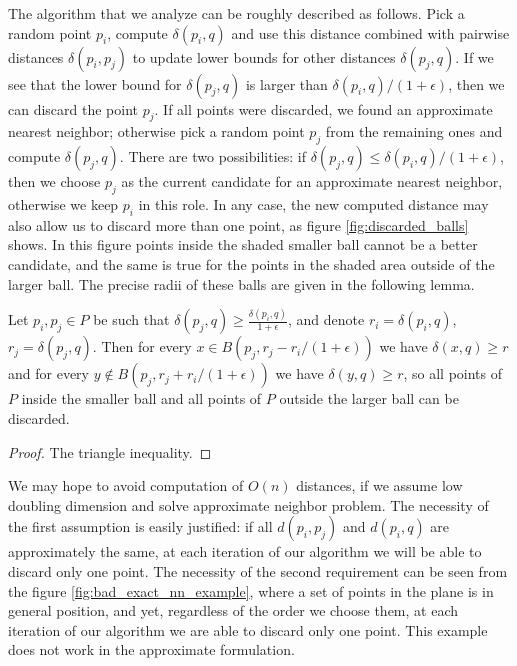 \documentclass[a4paper,USenglish]{socg-lipics-v2018}
\newcommand{\eps}{\epsilon}
\newcommand{\dist}{\delta}
\begin{document}
The algorithm that we analyze can be roughly described as follows. 
Pick a random point $p_i$,
compute $\dist(p_i, q)$ and use this distance combined with pairwise distances $\dist(p_i, p_j)$
to update lower bounds for other distances $\dist(p_j, q)$.
If we see that the lower bound for $\dist(p_j, q)$ is larger than $\dist(p_i, q) / (1+\eps)$, then 
we can discard the point $p_j$. If all points were discarded, we found an approximate nearest neighbor;
otherwise pick a random point $p_j$ from the remaining ones and compute $\dist(p_j, q)$.
There are two possibilities: if $\dist(p_j, q) \leq \dist(p_i, q) / (1+\eps)$,
then we choose $p_j$ as the current candidate for an approximate nearest neighbor,
otherwise we keep $p_i$ in this role. In any case, the new computed distance
may also allow us to discard more than one point, as figure \ref{fig:discarded_balls} shows. In
this figure points inside the shaded smaller ball cannot be a better candidate,
and the same is true for the points in the shaded area outside of the larger ball.
The precise radii of these balls are given in the following lemma.



\begin{lemma}
    Let $p_i, p_j \in P$ be such that $\dist(p_j, q) \geq \frac{\dist(p_i, q)}{1 + \eps}$,
    and denote $r_i = \dist(p_i, q)$, $r_j = \dist(p_j, q)$.
    Then for every $x \in B(p_j, r_j - r_i / (1+\eps))$ we have $\dist(x, q) \geq r$
    and for every $y \notin B(p_j, r_j + r_i / (1+ \eps))$ we have $\dist(y, q) \geq r$,
    so all points of $P$ inside the smaller ball and all points of $P$ outside the larger ball
    can be discarded.
\end{lemma}
\begin{proof}
    The triangle inequality.
\end{proof}


We may hope to avoid computation of $O(n)$ distances, if we assume low doubling dimension
and solve approximate neighbor problem. The necessity of the first assumption is easily justified: if all $d(p_i, p_j)$
and $d(p_i, q)$ are approximately the same, at each iteration of our algorithm we will be able to discard only one point.
The necessity of the second requirement can be seen from the figure \ref{fig:bad_exact_nn_example},
where a set of points in the plane is in general position, and yet, regardless of the order we choose them,
at each iteration of our algorithm we are able to discard only one point. This example does not work in the
approximate formulation.
\end{document}
